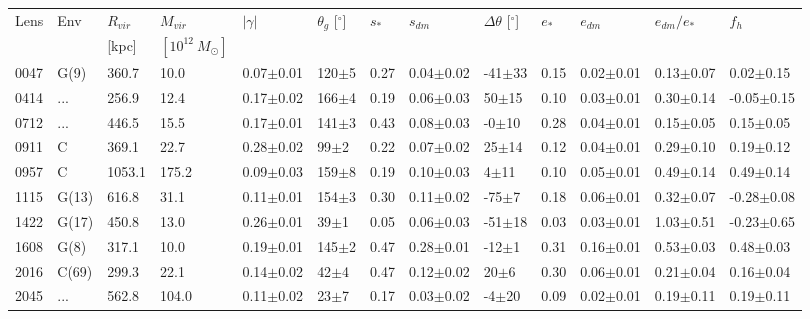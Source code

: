 \documentclass[useAMS,usenatbib]{mn2e}
\begin{document}
\begin{table}
\begin{center}
\begin{tabular}{l l l l l l l l l l l l l}
      \multirow{2}{*}{Lens} & \multirow{2}{*}{Env} & $R_{vir}$ & $M_{vir}$ & \multirow{2}{*}{$|\gamma|$} & \multirow{2}{*}{$\theta_{g}$ [$^{\circ}$]} &  \multirow{2}{*}{$s_{*}$} & \multirow{2}{*}{$s_{dm}$} & \multirow{2}{*}{$\Delta\theta$ [$^{\circ}$]} & \multirow{2}{*}{$e_{*}$} & \multirow{2}{*}{$e_{dm}$} & \multirow{2}{*}{$e_{dm}/e_{*}$} & \multirow{2}{*}{$f_h$} \\
       & & [kpc] & $[10^{12} \ M_{\odot}]$ & & & & & & & & & \\ \hline
      0047 & G(9) & 360.7 & 10.0 & 0.07$\pm$0.01 & 120$\pm$5 & 0.27 & 0.04$\pm$0.02 & -41$\pm$33 & 0.15 & 0.02$\pm$0.01 & 0.13$\pm$0.07 & 0.02$\pm$0.15 \\
      0414 & ... & 256.9 & 12.4 & 0.17$\pm$0.02 & 166$\pm$4 & 0.19 & 0.06$\pm$0.03 & 50$\pm$15 & 0.10 & 0.03$\pm$0.01 & 0.30$\pm$0.14 & -0.05$\pm$0.15 \\
      0712 & ... & 446.5 & 15.5 & 0.17$\pm$0.01 & 141$\pm$3 & 0.43 & 0.08$\pm$0.03 & -0$\pm$10 & 0.28 & 0.04$\pm$0.01 & 0.15$\pm$0.05 & 0.15$\pm$0.05 \\
      0911 & C & 369.1 & 22.7 & 0.28$\pm$0.02 & 99$\pm$2 & 0.22 & 0.07$\pm$0.02 & 25$\pm$14 & 0.12 & 0.04$\pm$0.01 & 0.29$\pm$0.10 & 0.19$\pm$0.12 \\
      0957 & C & 1053.1 & 175.2 & 0.09$\pm$0.03 & 159$\pm$8 & 0.19 & 0.10$\pm$0.03 & 4$\pm$11 & 0.10 & 0.05$\pm$0.01 & 0.49$\pm$0.14 & 0.49$\pm$0.14 \\
      1115 & G(13) & 616.8 & 31.1 & 0.11$\pm$0.01 & 154$\pm$3 & 0.30 & 0.11$\pm$0.02 & -75$\pm$7 & 0.18 & 0.06$\pm$0.01 & 0.32$\pm$0.07 & -0.28$\pm$0.08 \\
      1422 & G(17) & 450.8 & 13.0 & 0.26$\pm$0.01 & 39$\pm$1 & 0.05 & 0.06$\pm$0.03 & -51$\pm$18 & 0.03 & 0.03$\pm$0.01 & 1.03$\pm$0.51 & -0.23$\pm$0.65 \\
      1608 & G(8) & 317.1 & 10.0 & 0.19$\pm$0.01 & 145$\pm$2 & 0.47 & 0.28$\pm$0.01 & -12$\pm$1 & 0.31 & 0.16$\pm$0.01 & 0.53$\pm$0.03 & 0.48$\pm$0.03 \\
      2016 & C(69) & 299.3 & 22.1 & 0.14$\pm$0.02 & 42$\pm$4 & 0.47 & 0.12$\pm$0.02 & 20$\pm$6 & 0.30 & 0.06$\pm$0.01 & 0.21$\pm$0.04 & 0.16$\pm$0.04 \\
      2045 & ... & 562.8 & 104.0 & 0.11$\pm$0.02 & 23$\pm$7 & 0.17 & 0.03$\pm$0.02 & -4$\pm$20 & 0.09 & 0.02$\pm$0.01 & 0.19$\pm$0.11 & 0.19$\pm$0.11 \\

\end{tabular}
\end{center}
\end{table}
\end{document}
